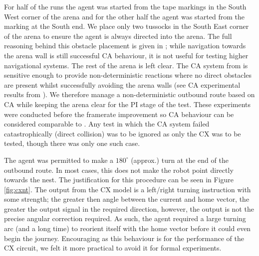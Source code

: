 \documentclass[a4paper,11pt,twoside,openright]{article}
\begin{document}
For half of the runs the agent was started from the tape markings in
the South West corner of the arena and for the other half the agent
was started from the marking at the South end.  We place only two
tussocks in the South East corner of the arena to ensure the agent is
always directed into the arena. The full reasoning behind this
obstacle placement is given in \cite{Mitchell2018}; while navigation
towards the arena wall is still successful CA behaviour, it is not
useful for testing higher navigational systems. The rest of the arena
is left clear. The CA system from \cite{Mitchell2018} is sensitive
enough to provide non-deterministic reactions where no direct
obstacles are present whilst successfully avoiding the arena walls
(see CA experimental results from \cite{Mitchell2018}). We therefore
manage a non-deterministic outbound route based on CA while keeping
the arena clear for the PI stage of the test. These experiments were
conducted before the framerate improvement so CA behaviour can be
considered comparable to \cite{Mitchell2018}. Any test in which the CA
system failed catastrophically (direct collision) was to be ignored as
only the CX was to be tested, though there was only one such case.
\newline\par

The agent was permitted to make a $180^{\circ}$ (approx.) turn at the
end of the outbound route. In most cases, this does not make the robot
point directly towards the nest. The justification for this procedure
can be seen in Figure \ref{fig:cxnt}. The output from the CX model is
a left/right turning instruction with some strength; the greater then
angle between the current and home vector, the greater the output
signal in the required direction, however, the output is not the
precise angular correction required. As such, the agent required a large
turning arc (and a long time) to reorient itself with the home vector
before it could even begin the journey. Encouraging as this behaviour
is for the performance of the CX circuit, we felt it more practical to
avoid it for formal experiments.
\newline\par
\end{document}
